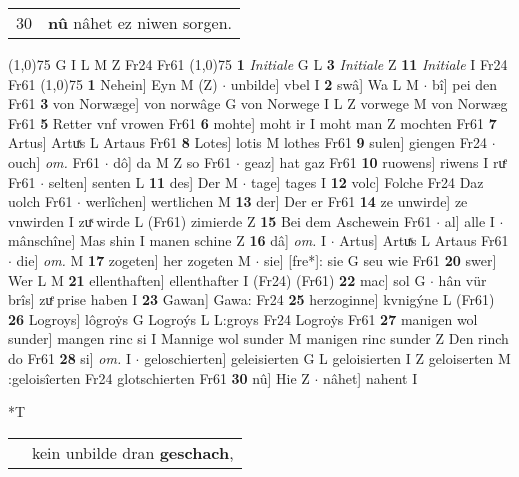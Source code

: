 \documentclass[8pt,a4paper,notitlepage]{article}
\begin{document}
\begin{table}[ht]
\begin{minipage}[t]{0.5\linewidth}
\begin{tabular}{rl}
30 & \textbf{nû} nâhet ez niwen sorgen.\\ 
\end{tabular}
\scriptsize
\line(1,0){75} \newline
G I L M Z Fr24 Fr61 \newline
\line(1,0){75} \newline
\textbf{1} \textit{Initiale} G L  \textbf{3} \textit{Initiale} Z  \textbf{11} \textit{Initiale} I Fr24 Fr61  \newline
\line(1,0){75} \newline
\textbf{1} Nehein] Eyn M (Z)  $\cdot$ unbilde] vbel I \textbf{2} swâ] Wa L M  $\cdot$ bî] pei den Fr61 \textbf{3} von Norwæge] von norwâge G von Norwege I L Z vorwege M von Norwæg Fr61 \textbf{5} Retter vnf vrowen Fr61 \textbf{6} mohte] moht ir I moht man Z mochten Fr61 \textbf{7} Artus] Artuͯs L Artaus Fr61 \textbf{8} Lotes] lotis M lothes Fr61 \textbf{9} sulen] giengen Fr24  $\cdot$ ouch] \textit{om.} Fr61  $\cdot$ dô] da M Z so Fr61  $\cdot$ geaz] hat gaz Fr61 \textbf{10} ruowens] riwens I ruͤ Fr61  $\cdot$ selten] senten L \textbf{11} des] Der M  $\cdot$ tage] tages I \textbf{12} volc] Folche Fr24 Daz uolch Fr61  $\cdot$ werlîchen] wertlichen M \textbf{13} der] Der er Fr61 \textbf{14} ze unwirde] ze vnwirden I zuͯ wirde L (Fr61) zimierde Z \textbf{15} Bei dem Aschewein Fr61  $\cdot$ al] alle I  $\cdot$ mânschîne] Mas shin I manen schine Z \textbf{16} dâ] \textit{om.} I  $\cdot$ Artus] Artuͯs L Artaus Fr61  $\cdot$ die] \textit{om.} M \textbf{17} zogeten] her zogeten M  $\cdot$ sie] [fre*]: sie G seu wie Fr61 \textbf{20} swer] Wer L M \textbf{21} ellenthaften] ellenthafter I (Fr24) (Fr61) \textbf{22} mac] sol G  $\cdot$ hân vür brîs] zuͤ prise haben I \textbf{23} Gawan] Gawa: Fr24 \textbf{25} herzoginne] kvnigýne L (Fr61) \textbf{26} Logroys] lôgroẏs G Logroýs L L:groys Fr24 Logroẏs Fr61 \textbf{27} manigen wol sunder] mangen rinc si I Mannige wol sunder M manigen rinc sunder Z Den rinch do Fr61 \textbf{28} si] \textit{om.} I  $\cdot$ geloschierten] geleisierten G L geloisierten I Z geloiserten M :geloisîerten Fr24 glotschierten Fr61 \textbf{30} nû] Hie Z  $\cdot$ nâhet] nahent I \newline
\end{minipage}
\hspace{0.5cm}
\begin{minipage}[t]{0.5\linewidth}
\small
\begin{center}*T
\end{center}
\begin{tabular}{rl}
 & kein unbilde dran \textbf{geschach},\\ 

\end{tabular}
\end{minipage}
\end{table}
\end{document}
